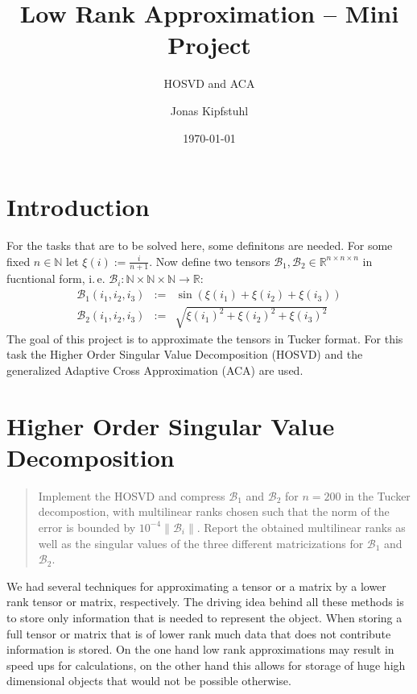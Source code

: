 \documentclass[%
a4paper,
parskip=half,
DIV=calc,
]
{scrartcl}
\title{Low Rank Approximation -- Mini Project}
\subtitle{HOSVD and ACA}
\author{Jonas Kipfstuhl}
\date{\today}
\begin{document}
\maketitle

\section*{Introduction}
\label{sec:intro}
For the tasks that are to be solved here, some definitons are
needed. For some fixed $n \in \mathbb{N}$ let
$\xi(i) := \frac{i}{n+1}$. Now define two tensors
$\mathcal{B}_1, \mathcal{B}_2 \in \mathbb{R}^{n \times n \times n}$ in
fucntional form, i.\,e.
$\mathcal{B}_i: \mathbb{N} \times \mathbb{N} \times \mathbb{N}
\rightarrow \mathbb{R}$:
\begin{align*}
  \mathcal{B}_1 \left(i_1, i_2, i_3 \right) &:=& \sin\left(\xi(i_1) + \xi(i_2) + \xi(i_3)\right) \\
  \mathcal{B}_2 \left(i_1, i_2, i_3 \right) &:=& \sqrt{\xi(i_1)^2 + \xi(i_2)^2 + \xi(i_3)^2}
\end{align*}
The goal of this project is to approximate the tensors in Tucker
format.  For this task the Higher Order Singular Value Decomposition
(HOSVD) and the generalized Adaptive Cross Approximation (ACA) are
used.


\section{Higher Order Singular Value Decomposition}
\label{sec:ex1}
\begin{quotation}
  \noindent
  Implement the HOSVD and compress $\mathcal{B}_1$ and
  $\mathcal{B }_2$ for $n = 200$ in the Tucker decompostion, with
  multilinear ranks chosen such that the norm of the error is bounded
  by $10^{−4} \|\mathcal{B}_i\|$.  Report the obtained multilinear
  ranks as well as the singular values of the three different
  matricizations for $\mathcal{B}_1$ and $\mathcal{B}_2$.
\end{quotation}

We had several techniques for approximating a tensor or a matrix by a
lower rank tensor or matrix, respectively.  The driving idea behind
all these methods is to store only information that is needed to
represent the object.  When storing a full tensor or matrix that is of
lower rank much data that does not contribute information is stored.
On the one hand low rank approximations may result in speed
ups for calculations, on the other hand this allows for storage of
huge high dimensional objects that would not be possible otherwise.
\end{document}
